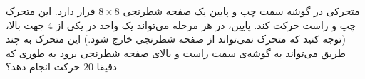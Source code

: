 \EXERCISE
متحرکی در گوشه سمت چپ و پایین یک صفحه شطرنجی
$8 \times 8$
قرار دارد. این متحرک در هر مرحله می‌تواند یک واحد در یکی از
$4$
جهت بالا‫‪،‬‬ پایین‫‪،‬‬ چپ و راست حرکت کند. (توجه کنید که متحرک نمی‌تواند از صفحه شطرنجی خارج شود.)
این متحرک به چند طریق می‌تواند به گوشه‌ی سمت راست و بالای صفحه شطرنجی برود به طوری که دقیقا
$20$
حرکت انجام دهد؟